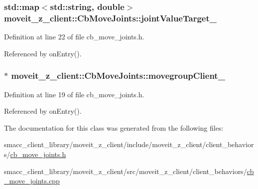 \subsubsection[{\texorpdfstring{joint\+Value\+Target\+\_\+}{jointValueTarget_}}]{\setlength{\rightskip}{0pt plus 5cm}std\+::map$<$std\+::string, double$>$ moveit\+\_\+z\+\_\+client\+::\+Cb\+Move\+Joints\+::joint\+Value\+Target\+\_\+}\hypertarget{classmoveit__z__client_1_1CbMoveJoints_a0f52577dd2fccf25f36c4c93e733c0f4}{}\label{classmoveit__z__client_1_1CbMoveJoints_a0f52577dd2fccf25f36c4c93e733c0f4}


Definition at line 22 of file cb\+\_\+move\+\_\+joints.\+h.



Referenced by on\+Entry().

\subsubsection[{\texorpdfstring{movegroup\+Client\+\_\+}{movegroupClient_}}]{$\ast$ moveit\+\_\+z\+\_\+client\+::\+Cb\+Move\+Joints\+::movegroup\+Client\+\_\+\hspace{0.3cm}{\ttfamily [protected]}}\hypertarget{classmoveit__z__client_1_1CbMoveJoints_a2ce2e613b676025766dcd2f01ae50810}{}\label{classmoveit__z__client_1_1CbMoveJoints_a2ce2e613b676025766dcd2f01ae50810}


Definition at line 19 of file cb\+\_\+move\+\_\+joints.\+h.



Referenced by on\+Entry().



The documentation for this class was generated from the following files\+:\begin{DoxyCompactItemize}
\item 
smacc\+\_\+client\+\_\+library/moveit\+\_\+z\+\_\+client/include/moveit\+\_\+z\+\_\+client/client\+\_\+behaviors/\hyperlink{cb__move__joints_8h}{cb\+\_\+move\+\_\+joints.\+h}\item 
smacc\+\_\+client\+\_\+library/moveit\+\_\+z\+\_\+client/src/moveit\+\_\+z\+\_\+client/client\+\_\+behaviors/\hyperlink{cb__move__joints_8cpp}{cb\+\_\+move\+\_\+joints.\+cpp}\end{DoxyCompactItemize}
